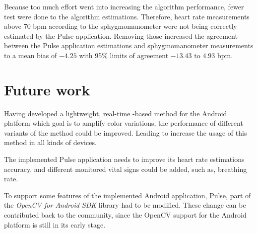 Because too much effort went into increasing the algorithm performance,
fewer test were done to the algorithm estimations. Therefore, heart rate
measurements above 70 bpm according to the sphygmomanometer were not being
correctly estimated by the Pulse application. Removing those increased the
agreement between the Pulse application estimations and sphygmomanometer
measurements to a mean bias of $-4.25$ with 95\% limits of agreement $-13.43$
to $4.93$ bpm.

\pagebreak

\section{Future work} \label{sec:conclusions:future}

Having developed a lightweight, real-time \evm{}-based method for the
Android platform which goal is to amplify color variations, the performance
of different variants of the \evm{} method could be improved. Leading
to increase the usage of this method in all kinds of devices.

The implemented Pulse application needs to improve its heart rate estimations
accuracy, and different monitored vital signs could be added, such as,
breathing rate.

To support some features of the implemented Android application, Pulse,
part of the \emph{OpenCV for Android SDK} library had to be modified. These
change can be contributed back to the community, since the OpenCV support
for the Android platform is still in its early stage.
